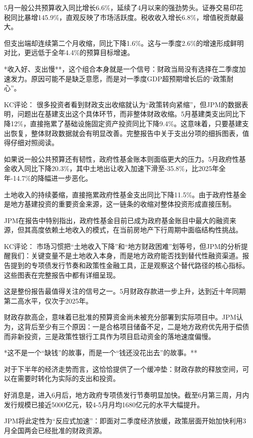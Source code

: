 \documentclass[11pt]{ctexart}
\begin{document}
5月一般公共预算收入同比增长6.6\%，延续了4月以来的强劲势头。证券交易印花税同比暴增145.9\%，直观反映了市场活跃度。税收收入增长6.8\%，增值税贡献最大。

但支出端却连续第二个月收缩，同比下降1.6\%。这与一季度2.6\%的增速形成鲜明对比，更远低于全年4.4\%的预算目标增速。

*收入好、支出慢**，这个组合本身就是一个信号：财政当局没有选择在二季度加速发力。原因可能不是缺乏意愿，而是对一季度GDP超预期增长后的“政策耐心”。

KC评论： 很多投资者看到财政支出收缩就认为“政策转向紧缩”，但JPM的数据表明，问题出在基建支出这个具体环节，而非整体财政收缩。5月基建类支出同比下降12\%，直接拖累了基础设施固定资产投资同比下降9.4\%。这意味着，只要基建支出恢复，整体财政数据就会有明显改善。完整报告中关于支出分项的细拆图表，值得仔细对照阅读。

如果说一般公共预算还有韧性，政府性基金账本则面临更大的压力。5月政府性基金收入同比下降20.3\%，其中土地出让收入加速下滑至-35.8\%，比2025年全年-14.7\%的降幅进一步恶化。

土地收入的持续萎缩，直接拖累政府性基金支出同比下降11.5\%。由于政府性基金是地方基建投资的重要资金来源，这一链条的收缩对整体投资形成直接压制。

JPM在报告中特别指出，政府性基金目前已成为政府基金账目中最大的融资来源，但其高度依赖土地收入的模式，在当前房地产下行周期中面临结构性挑战。

KC评论： 市场习惯把“土地收入下降”和“地方财政困难”划等号，但JPM的分析提醒我们：关键变量不是土地收入本身，而是地方政府能否找到替代性融资渠道。报告提到的专项债发行节奏和政策性金融工具，正是观察这个替代路径的核心指标。这些图表在完整报告中都有详细呈现。

这是整份报告最值得关注的信号之一。5月财政存款进一步上升，达到近十年同期第二高水平，仅次于2025年。

财政存款高企，意味着已批准的预算资金尚未被充分部署到实际项目中。JPM认为，这背后至少有三个原因：一是合格项目储备不足，二是地方政府优先用于偿债而非新投资，三是政策性银行工具作为项目启动资金的落地速度偏慢。

*这不是一个“缺钱”的故事，而是一个“钱还没花出去”的故事。**

对于下半年的经济走势而言，这恰恰提供了一个缓冲垫：财政存款的释放空间，可以在需要时转化为实际的支出和投资。

好消息是，进入6月后，地方政府专项债发行节奏明显加快。截至6月第三周，月内发行规模已接近5000亿元，较4-5月月均1680亿元的水平大幅提升。

JPM将此定性为“反应式加速”：即面对二季度经济放缓，政策层面开始加快利用3月全国两会已经批准的财政资源。
\end{document}
